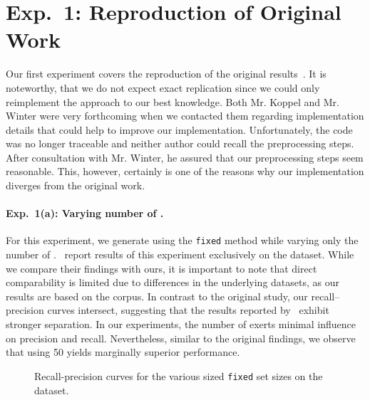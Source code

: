 
\section{Exp.\ 1: Reproduction of Original Work}

Our first experiment covers the reproduction of the original results~\citep{koppel_determining_2014}.
It is noteworthy, that we do not expect exact replication since we could only reimplement the approach to our best knowledge.
Both Mr. Koppel and Mr. Winter were very forthcoming when we contacted them regarding implementation details that could help to improve our implementation.
Unfortunately, the code was no longer traceable and neither author could recall the preprocessing steps.
After consultation with Mr. Winter, he assured that our preprocessing steps seem reasonable.
This, however, certainly is one of the reasons why our implementation diverges from the original work.

\paragraph{Exp.\ 1(a): Varying number of \imps{}.}

For this experiment, we generate \imps{} using the \texttt{fixed} method while varying only the number of \imps{}.
\citet{koppel_determining_2014}\ report results of this experiment exclusively on the \dataBlog{} dataset.
While we compare their findings with ours, it is important to note that direct comparability is limited due to differences in the underlying datasets, as our results are based on the \dataStudent{} corpus.
In contrast to the original study, our \impAppr{} recall–precision curves intersect, suggesting that the results reported by \citet{koppel_determining_2014}\ exhibit stronger separation.
In our experiments, the number of \imps{} exerts minimal influence on precision and recall.
Nevertheless, similar to the original findings, we observe that using 50 \imps{} yields marginally superior performance.


\begin{figure}[htbp]
    \centering
    
    \caption[Recall-precision curves for the various sized \imp{} set sizes.]{Recall-precision curves for the various sized \texttt{fixed} \imp{} set sizes on the \dataStudent{} dataset.}
    \label{fig:student_essays_dif_n}
\end{figure}

